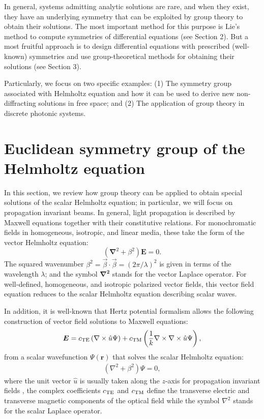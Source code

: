 \documentclass[12pt]{iopart}
\begin{document}
In general, systems admitting analytic solutions are rare, and when they exist, they have an underlying
symmetry that can be exploited by group theory to obtain their solutions. The most important method for this purpose is Lie's method to compute symmetries of differential equations (see Section 2).
But a most fruitful approach is to design differential equations with prescribed (well-known) symmetries  and use
group-theoretical methods for obtaining their solutions (see  Section 3).


Particularly, we focus on two specific examples: (1) The symmetry group associated with Helmholtz equation and how it can be used to derive new non-diffracting solutions in free space; and (2) The application of group theory in discrete photonic systems.





\section{Euclidean symmetry group of the Helmholtz equation}
In this section, we review how group theory can be applied to obtain special solutions of the scalar Helmholtz equation; in particular, we will focus on propagation invariant beams.
In general, light propagation is described by Maxwell equations together with their constitutive relations.
For monochromatic fields in homogeneous, isotropic, and linear media, these take the form of the vector Helmholtz equation:
\begin{equation} \label{eq:Eq1}
\left(\bm{\nabla}^2 + \beta^2 \right) \bm{E}  = 0.
\end{equation}
The squared wavenumber $\beta^2 = \vec{\beta} \cdot \vec{\beta} = \left( 2 \pi / \lambda \right)^{2}$ is given in terms of the wavelength $\lambda$; and the symbol $\bm{\nabla^2}$ stands for the vector Laplace operator.
For well-defined, homogeneous, and isotropic polarized vector fields, this vector field equation reduces to the scalar Helmholtz equation describing scalar waves.

In addition, it is well-known that Hertz potential formalism  \cite{Stratton1941} allows the following construction of vector field solutions to Maxwell equations:
\begin{equation} \label{eq:Eq2}
\bm{E} = c_{\rm TE} \left( \nabla \times \hat{u} \Psi \right) + c_{\rm TM} \left( \frac{1}{k} \nabla \times \nabla \times \hat{u}  \Psi \right),
\end{equation}
from a scalar wavefunction $\Psi(\bm{r})$ that solves the scalar Helmholtz equation:
\begin{eqnarray} \label{eq:Eq3}
\left( \nabla^2 + \beta^2 \right) \Psi = 0 ,
\end{eqnarray}
where the unit vector $\hat{u}$ is usually taken along the $z$-axis for propagation invariant fields \cite{VolkeSepulveda2006p867}, the complex coefficients $c_{\rm TE}$ and $c_{\rm TM}$ define the transverse electric and transverse magnetic components of the optical field while the symbol $\nabla^2$ stands for the scalar Laplace operator.
\end{document}
